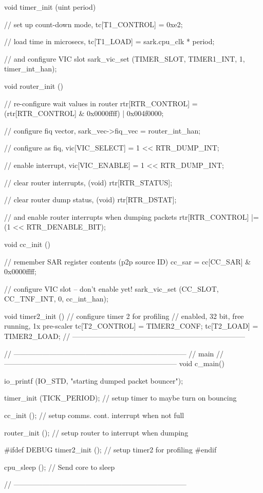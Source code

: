 \documentclass[oneside, a4paper, 11pt]{memoir}
\begin{document}
\begin{pyglist}[language=c]
void timer_init (uint period)
{
// set up count-down mode,
tc[T1_CONTROL] = 0xe2;

// load time in microsecs,
tc[T1_LOAD] = sark.cpu_clk * period;

// and configure VIC slot
sark_vic_set (TIMER_SLOT, TIMER1_INT, 1, timer_int_han);
}


void router_init ()
{
// re-configure wait values in router
rtr[RTR_CONTROL] = (rtr[RTR_CONTROL] & 0x0000ffff) | 0x004f0000;

// configure fiq vector,
sark_vec->fiq_vec = router_int_han;

// configure as fiq,
vic[VIC_SELECT] = 1 << RTR_DUMP_INT;

// enable interrupt,
vic[VIC_ENABLE] = 1 << RTR_DUMP_INT;

// clear router interrupts,
(void) rtr[RTR_STATUS];

// clear router dump status,
(void) rtr[RTR_DSTAT];

// and enable router interrupts when dumping packets
rtr[RTR_CONTROL] |= (1 << RTR_DENABLE_BIT);
}


void cc_init ()
{
// remember SAR register contents (p2p source ID)
cc_sar = cc[CC_SAR] & 0x0000ffff;

// configure VIC slot -- don't enable yet!
sark_vic_set (CC_SLOT, CC_TNF_INT, 0, cc_int_han);
}


void timer2_init ()
{
// configure timer 2 for profiling
// enabled, 32 bit, free running, 1x pre-scaler
tc[T2_CONTROL] = TIMER2_CONF;
tc[T2_LOAD] = TIMER2_LOAD;
}
// ------------------------------------------------------------------------


// ------------------------------------------------------------------------
// main
// ------------------------------------------------------------------------
void c_main()
{
io_printf (IO_STD, "starting dumped packet bouncer\n");

timer_init (TICK_PERIOD);  // setup timer to maybe turn on bouncing

cc_init ();                // setup comms. cont. interrupt when not full

router_init ();            // setup router to interrupt when dumping

#ifdef DEBUG
timer2_init ();          // setup timer2 for profiling
#endif

cpu_sleep ();		     // Send core to sleep
}
// ------------------------------------------------------------------------
\end{pyglist}
\end{document}
